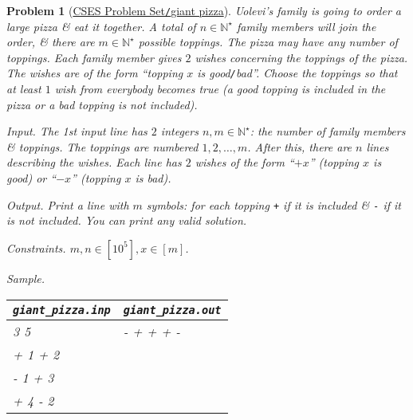 \documentclass{article}
\newtheorem{problem}{Problem}
\begin{document}
\begin{problem}[\href{https://cses.fi/problemset/task/1684}{CSES Problem Set{\tt/}giant pizza}]
    Uolevi's family is going to order a large pizza \& eat it together. A total of $n\in\mathbb{N}^\star$ family members will join the order, \& there are $m\in\mathbb{N}^\star$ possible toppings. The pizza may have any number of toppings. Each family member gives $2$ wishes concerning the toppings of the pizza. The wishes are of the form ``topping $x$ is good{\tt/}bad''. Choose the toppings so that at least $1$ wish from everybody becomes true (a good topping is included in the pizza or a bad topping is not included).
    \item {\sf Input.} The 1st input line has $2$ integers $n,m\in\mathbb{N}^\star$: the number of family members \& toppings. The toppings are numbered $1,2,\ldots,m$. After this, there are $n$ lines describing the wishes. Each line has $2$ wishes of the form ``$+ x$'' (topping $x$ is good) or ``$-x$'' (topping $x$ is bad).
    \item {\sf Output.} Print a line with $m$ symbols: for each topping {\tt+} if it is included \& {\tt-} if it is not included. You can print any valid solution.
    \item {\sf Constraints.} $m,n\in[10^5],x\in[m]$.
    \item {\sf Sample.}
    \begin{table}[H]
        \centering
        \begin{tabular}{|l|l|}
            \hline
            \verb|giant_pizza.inp| & \verb|giant_pizza.out| \\
            \hline
            3 5 & - + + + - \\
            + 1 + 2 & \\
            - 1 + 3 & \\
            + 4 - 2 & \\
            \hline
        \end{tabular}
    \end{table}
\end{problem}
\end{document}
